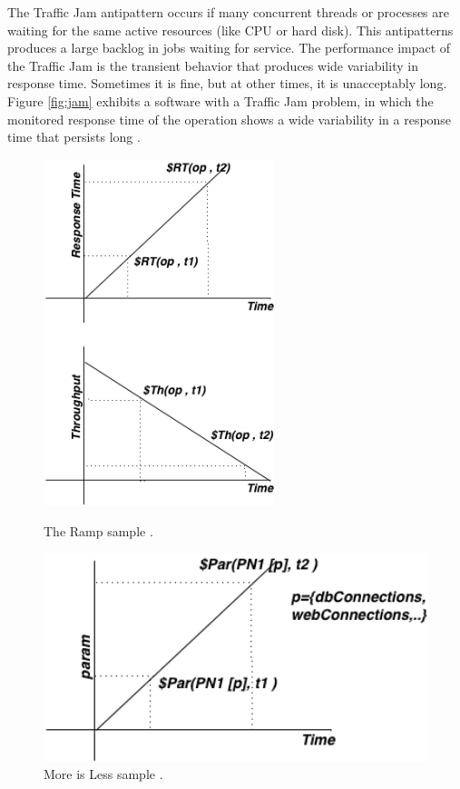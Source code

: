 \documentclass[espaco=umemeio,chapter=TITLE,twoside,openright]{abnt}
\begin{document}
The Traffic Jam antipattern occurs if many concurrent threads or processes are waiting for the same  active resources (like CPU or hard disk). This antipatterns produces a large backlog in jobs waiting for service. The performance impact of the Traffic Jam is the transient behavior that produces wide variability in response time. Sometimes it is fine, but at other times, it is unacceptably long. Figure \ref{fig:jam} exhibits a software with a Traffic Jam problem, in which the monitored response time of the operation shows a wide variability in a response time that persists long \cite{Vetoio2011}.


\begin{figure}[!h]
\begin{minipage}{.5\textwidth}
\centering
\includegraphics[width=0.6\textwidth]{./images/ramp.png}
\caption{The Ramp sample \cite{Vetoio2011}.}
\label{fig:ramp}
\end{minipage}
\begin{minipage}{.5\textwidth}
\centering
\includegraphics[width=1\textwidth]{./images/moreisless.png}
\caption{More is Less sample \cite{Vetoio2011}.}
\label{fig:moreisless}
\end{minipage}
\end{figure}
\end{document}
